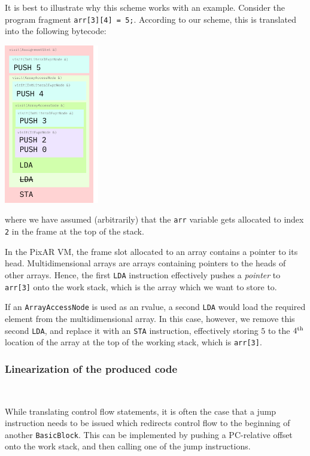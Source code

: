 \documentclass[11pt,a4paper]{scrartcl}
\begin{document}
It is best to illustrate why this scheme works with an example. Consider the program fragment \verb|arr[3][4] = 5;|. According to our scheme, this is translated into the following bytecode:

\begin{center}
  \includegraphics[width=0.31\textwidth]{lvalue_example}
\end{center}

where we have assumed (arbitrarily) that the \verb|arr| variable gets allocated to index \verb|2| in the frame at the top of the stack.

In the PixAR VM, the frame slot allocated to an array contains a pointer to its head. Multidimensional arrays are arrays containing pointers to the heads of other arrays. Hence, the first \verb|LDA| instruction effectively pushes a \textit{pointer} to \verb|arr[3]| onto the work stack, which is the array which we want to store to.

If an \verb|ArrayAccessNode| is used as an rvalue, a second \verb|LDA| would load the required element from the multidimensional array. In this case, however, we remove this second \verb|LDA|, and replace it with an \verb|STA| instruction, effectively storing $5$ to the $4\textsuperscript{th}$ location of the array at the top of the working stack, which is \verb|arr[3]|.

\subsubsection{Linearization of the produced code}~\label{code-linearization}

While translating control flow statements, it is often the case that a jump instruction needs to be issued which redirects control flow to the beginning of another \verb|BasicBlock|. This can be implemented by pushing a PC-relative offset onto the work stack, and then calling one of the jump instructions.
\end{document}
